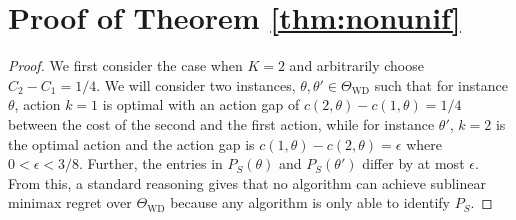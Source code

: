 \documentclass[11pt]{article} %
\newcommand{\todoc}[2][]{\todo[color=Apricot!20,size=\tiny,#1]{Cs: #2}}
\newcommand{\todom}[2][]{\todo[color=Cerulean!20,size=\tiny,#1]{M: #2}}
\newcommand{\WD}{\mathrm{WD}}
\newcommand{\TWD}{\Theta_{\WD}}
\begin{document}
\section*{Proof of Theorem \ref{thm:nonunif}}
\begin{proof}
We first consider the case when $K=2$ and arbitrarily choose $C_2 - C_1 = 1/4$. 
We will consider two instances, $\theta,\theta'\in \TWD$ such that for instance $\theta$, 
action $k=1$ is optimal with an action gap of $c(2,\theta) - c(1,\theta) = 1/4$ between the cost of the second and the first
action,  while for instance $\theta'$, $k=2$ is the optimal action and the action gap is $c(1,\theta) - c(2,\theta) = \epsilon$
where $0<\epsilon<3/8$.
Further, the entries in $P_S(\theta)$ and $P_S(\theta')$ differ by at most $\epsilon$. 
From this, a standard reasoning gives that no algorithm can achieve sublinear minimax regret over $\TWD$ because any
algorithm is only able to identify $P_S$. 


\end{proof}
\end{document}
